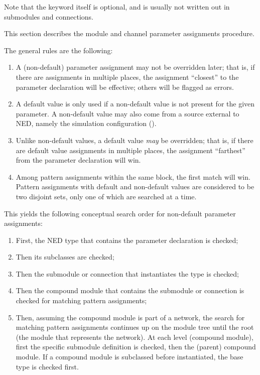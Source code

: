 Note that the  keyword itself is optional,
and is usually not written out in submodules and connections.

This section describes the module and channel parameter assignments procedure.

The general rules are the following:

\begin{enumerate}
  \item A (non-default) parameter assignment may not be overridden later;
    that is, if there are assignments in multiple places, the assignment
    ``closest'' to the parameter declaration will be effective; others
    will be flagged as errors.
  \item A default value is only used if a non-default value is not present
    for the given parameter. A non-default value may also come from a source
    external to NED, namely the simulation configuration ().
  \item Unlike non-default values, a default value \textit{may} be overridden;
    that is, if there are default value assignments in multiple places,
    the assignment ``farthest'' from the parameter declaration will win.
  \item Among pattern assignments within the same 
    block, the first match will win. Pattern assignments with default and
    non-default values are considered to be two disjoint sets, only one of
    which are searched at a time.
\end{enumerate}

This yields the following conceptual search order for non-default parameter
assignments:

\begin{enumerate}
  \item First, the NED type that contains the parameter declaration is checked;
  \item Then its subclasses are checked;
  \item Then the submodule or connection that instantiates the type is checked;
  \item Then the compound module that contains the submodule or connection is
    checked for matching pattern assignments;
  \item Then, assuming the compound module is part of a network, the search
    for matching pattern assignments continues up on the module tree until the root
    (the module that represents the network). At each level (compound module),
    first the specific submodule definition is checked, then the (parent) compound module.
    If a compound module is subclassed before instantiated, the base type is checked
    first.
\end{enumerate}

